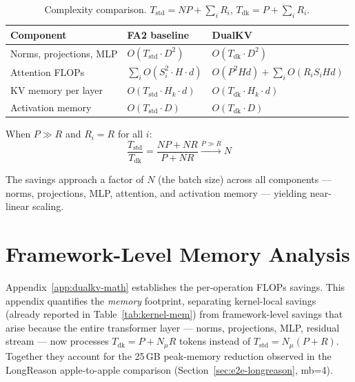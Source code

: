 \documentclass{article}
\begin{document}
\begin{table}[ht]
\centering
\caption{Complexity comparison. $T_{\text{std}} = NP + \sum_i R_i$, $T_{\text{dk}} = P + \sum_i R_i$.}
\label{tab:complexity}
\begin{tabular}{@{}lll@{}}
\toprule
\textbf{Component} & \textbf{FA2 baseline} & \textbf{DualKV} \\
\midrule
Norms, projections, MLP & $O(T_{\text{std}} \cdot D^2)$ & $O(T_{\text{dk}} \cdot D^2)$ \\
Attention FLOPs & $\sum_i O(S_i^2 \cdot H \cdot d)$ & $O(P^2 Hd) + \sum_i O(R_i S_i Hd)$ \\
KV memory per layer & $O(T_{\text{std}} \cdot H_k \cdot d)$ & $O(T_{\text{dk}} \cdot H_k \cdot d)$ \\
Activation memory & $O(T_{\text{std}} \cdot D)$ & $O(T_{\text{dk}} \cdot D)$ \\
\bottomrule
\end{tabular}
\end{table}

When $P \gg R$ and $R_i = R$ for all $i$:
\begin{equation}
  \frac{T_{\text{std}}}{T_{\text{dk}}} = \frac{NP + NR}{P + NR} \xrightarrow{P \gg R} N
\end{equation}

The savings approach a factor of $N$ (the batch size) across all components --- norms, projections, MLP, attention, and activation memory --- yielding near-linear scaling.

\iffalse
\section{Framework-Level Memory Analysis}
\label{app:framework-memory}

Appendix~\ref{app:dualkv-math} establishes the per-operation FLOPs savings. This appendix quantifies the \emph{memory} footprint, separating kernel-local savings (already reported in Table~\ref{tab:kernel-mem}) from framework-level savings that arise because the entire transformer layer --- norms, projections, MLP, residual stream --- now processes $T_{\text{dk}} = P + N_\mu R$ tokens instead of $T_{\text{std}} = N_\mu(P+R)$. Together they account for the 25\,GB peak-memory reduction observed in the LongReason apple-to-apple comparison (Section~\ref{sec:e2e-longreason}, mb=4).
\end{document}
